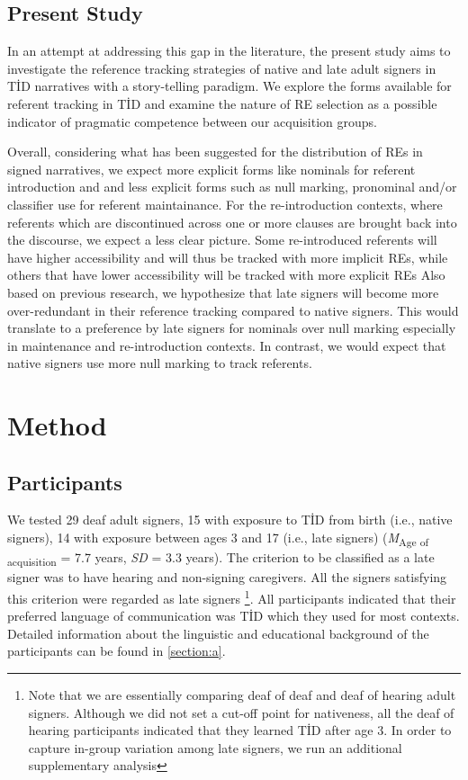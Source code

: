 \documentclass[review]{elsarticle} %
\begin{document}
\hypertarget{present-study}{%
\subsection{Present Study}\label{present-study}}

In an attempt at addressing this gap in the literature, the present
study aims to investigate the reference tracking strategies of native
and late adult signers in TİD narratives with a story-telling paradigm.
We explore the forms available for referent tracking in TİD and examine
the nature of RE selection as a possible indicator of pragmatic
competence between our acquisition groups.

Overall, considering what has been suggested for the distribution of REs
in signed narratives, we expect more explicit forms like nominals for
referent introduction and and less explicit forms such as null marking,
pronominal and/or classifier use for referent maintainance. For the
re-introduction contexts, where referents which are discontinued across
one or more clauses are brought back into the discourse, we expect a
less clear picture. Some re-introduced referents will have higher
accessibility and will thus be tracked with more implicit REs, while
others that have lower accessibility will be tracked with more explicit
REs Also based on previous research, we hypothesize that late signers
will become more over-redundant in their reference tracking compared to
native signers. This would translate to a preference by late signers for
nominals over null marking especially in maintenance and re-introduction
contexts. In contrast, we would expect that native signers use more null
marking to track referents.

\hypertarget{method}{%
\section{Method}\label{method}}

\hypertarget{participants}{%
\subsection{Participants}\label{participants}}

We tested 29 deaf adult signers, 15 with exposure to TİD from birth
(i.e., native signers), 14 with exposure between ages 3 and 17 (i.e.,
late signers) (\emph{M}\textsubscript{Age of acquisition} = 7.7 years,
\emph{SD} = 3.3 years). The criterion to be classified as a late signer
was to have hearing and non-signing caregivers. All the signers
satisfying this criterion were regarded as late signers
\footnote{Note that we are essentially comparing deaf of deaf and deaf of hearing adult signers. Although we did not set a cut-off point for nativeness, all the deaf of hearing participants indicated that they learned TİD after age 3. In order to capture in-group variation among late signers, we run an additional supplementary analysis}.
All participants indicated that their preferred language of
communication was TİD which they used for most contexts. Detailed
information about the linguistic and educational background of the
participants can be found in \ref{section:a}.
\end{document}

